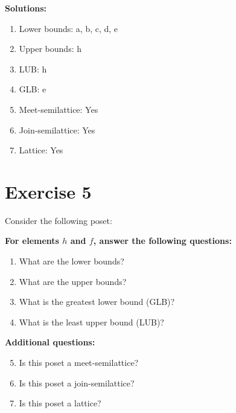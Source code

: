 \documentclass{article}
\begin{document}
\textbf{Solutions:}
\begin{enumerate}
    \item Lower bounds: {a, b, c, d, e}
    \item Upper bounds: {h}
    \item LUB: h
    \item GLB: e
    \item Meet-semilattice: Yes
    \item Join-semilattice: Yes
    \item Lattice: Yes
\end{enumerate}
\newpage
\section*{Exercise 5}
Consider the following poset:
\begin{center}
\end{center}

    \textbf{For elements $h$ and $f$, answer the following questions:}
\begin{enumerate}
    \item What are the lower bounds?
    \item What are the upper bounds?
    \item What is the greatest lower bound (GLB)?
    \item What is the least upper bound (LUB)?
\end{enumerate}
    \hspace*{3ex} \textbf{Additional questions:}
\begin{enumerate}
    \setcounter{enumi}{4}
    \item Is this poset a meet-semilattice?
    \item Is this poset a join-semilattice?
    \item Is this poset a lattice?
\end{enumerate}
\end{document}
